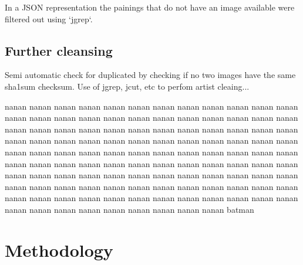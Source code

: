 \documentclass[11pt,a4paper]{report}
\begin{document}
\begin{multicols}{2}
In a JSON representation the painings that do not have an image available were
filtered out using `jgrep`.

\section{Further cleansing}

Semi automatic check for duplicated by checking if no two images have the same
sha1sum checksum.  Use of jgrep, jcut, etc to perfom artist cleaing...

nanan nanan nanan nanan nanan nanan nanan nanan nanan nanan nanan nanan nanan
nanan nanan nanan nanan nanan nanan nanan nanan nanan nanan nanan nanan nanan
nanan nanan nanan nanan nanan nanan nanan nanan nanan nanan nanan nanan nanan
nanan nanan nanan nanan nanan nanan nanan nanan nanan nanan nanan nanan nanan
nanan nanan nanan nanan nanan nanan nanan nanan nanan nanan nanan nanan nanan
nanan nanan nanan nanan nanan nanan nanan nanan nanan nanan nanan nanan nanan
nanan nanan nanan nanan nanan nanan nanan nanan nanan nanan nanan nanan nanan
nanan nanan nanan nanan nanan nanan nanan nanan nanan nanan nanan nanan nanan
nanan nanan nanan nanan nanan nanan nanan nanan nanan nanan nanan nanan nanan
batman

\end{multicols}

\chapter{Methodology}
\end{document}
